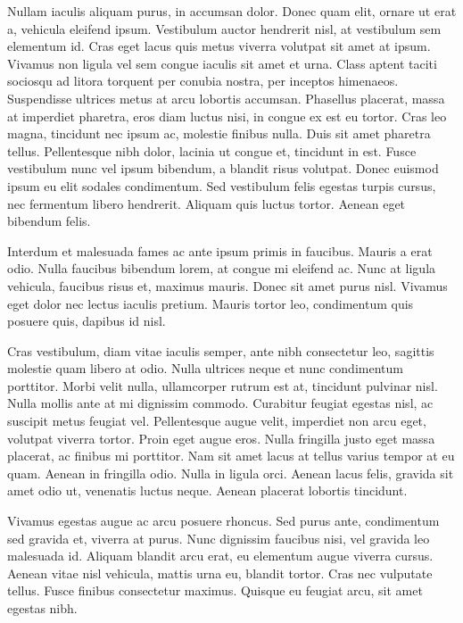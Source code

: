 Nullam iaculis aliquam purus, in accumsan dolor. Donec quam elit, ornare ut erat a, vehicula eleifend ipsum. Vestibulum auctor hendrerit nisl, at vestibulum sem elementum id. Cras eget lacus quis metus viverra volutpat sit amet at ipsum. Vivamus non ligula vel sem congue iaculis sit amet et urna. Class aptent taciti sociosqu ad litora torquent per conubia nostra, per inceptos himenaeos. Suspendisse ultrices metus at arcu lobortis accumsan. Phasellus placerat, massa at imperdiet pharetra, eros diam luctus nisi, in congue ex est eu tortor. Cras leo magna, tincidunt nec ipsum ac, molestie finibus nulla. Duis sit amet pharetra tellus. Pellentesque nibh dolor, lacinia ut congue et, tincidunt in est. Fusce vestibulum nunc vel ipsum bibendum, a blandit risus volutpat. Donec euismod ipsum eu elit sodales condimentum. Sed vestibulum felis egestas turpis cursus, nec fermentum libero hendrerit. Aliquam quis luctus tortor. Aenean eget bibendum felis.

Interdum et malesuada fames ac ante ipsum primis in faucibus. Mauris a erat odio. Nulla faucibus bibendum lorem, at congue mi eleifend ac. Nunc at ligula vehicula, faucibus risus et, maximus mauris. Donec sit amet purus nisl. Vivamus eget dolor nec lectus iaculis pretium. Mauris tortor leo, condimentum quis posuere quis, dapibus id nisl.

Cras vestibulum, diam vitae iaculis semper, ante nibh consectetur leo, sagittis molestie quam libero at odio. Nulla ultrices neque et nunc condimentum porttitor. Morbi velit nulla, ullamcorper rutrum est at, tincidunt pulvinar nisl. Nulla mollis ante at mi dignissim commodo. Curabitur feugiat egestas nisl, ac suscipit metus feugiat vel. Pellentesque augue velit, imperdiet non arcu eget, volutpat viverra tortor. Proin eget augue eros. Nulla fringilla justo eget massa placerat, ac finibus mi porttitor. Nam sit amet lacus at tellus varius tempor at eu quam. Aenean in fringilla odio. Nulla in ligula orci. Aenean lacus felis, gravida sit amet odio ut, venenatis luctus neque. Aenean placerat lobortis tincidunt.

Vivamus egestas augue ac arcu posuere rhoncus. Sed purus ante, condimentum sed gravida et, viverra at purus. Nunc dignissim faucibus nisi, vel gravida leo malesuada id. Aliquam blandit arcu erat, eu elementum augue viverra cursus. Aenean vitae nisl vehicula, mattis urna eu, blandit tortor. Cras nec vulputate tellus. Fusce finibus consectetur maximus. Quisque eu feugiat arcu, sit amet egestas nibh.

\endmulti

\bye 
